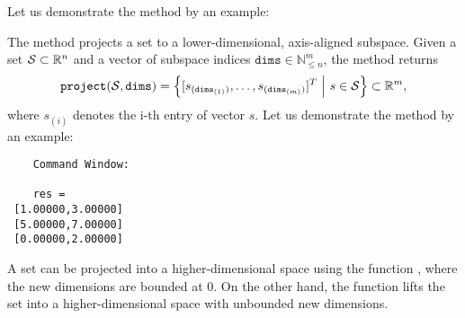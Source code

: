 Let us demonstrate the method   by an example:

\begin{center}
\begin{minipage}[t]{0.40\textwidth}
	\vspace{10pt}
	\footnotesize
	
\end{minipage}
\begin{minipage}[t]{0.3\textwidth}
	\vspace{0pt}
	\centering
\end{minipage}
\end{center}


\vspace{1cm}


The method  projects a set to a lower-dimensional, axis-aligned subspace. Given a set $\mathcal{S} \subset \mathbb{R}^n$ and a vector of subspace indices $\texttt{dims} \in \mathbb{N}_{\leq n}^m$, the method  returns
\begin{equation*}
	{\normalfont \texttt{project}}(\mathcal{S},\texttt{dims}) = \Big \{ [s_{(\texttt{dims}_{(1)})},\dots,s_{(\texttt{dims}_{(m)})}]^T ~\Big |~ s \in \mathcal{S} \Big \} \subset \mathbb{R}^m,
\end{equation*}
where $s_{(i)}$ denotes the i-th entry of vector $s$. Let us demonstrate the method   by an example:

\begin{center}
\begin{minipage}[t]{0.40\textwidth}
	\vspace{10pt}
	\footnotesize
	
\end{minipage}
\begin{minipage}[t]{0.25\textwidth}
	\vspace{10pt}

	\begin{verbatim}	
	Command Window:
	
	res = 
 [1.00000,3.00000]
 [5.00000,7.00000]
 [0.00000,2.00000]
	\end{verbatim}
\end{minipage}
\end{center}

A set can be projected into a higher-dimensional space using the function ,
where the new dimensions are bounded at 0.
On the other hand, the function  lifts the set into a higher-dimensional space with unbounded new dimensions.
